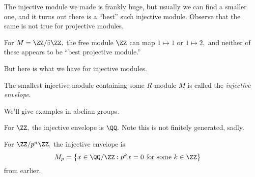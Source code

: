 The injective module we made is frankly huge, but usually we can find a smaller one, and it turns out there is a ``best'' such injective module. Observe that the same is not true for projective modules.
\begin{example}
	For $M=\ZZ/5\ZZ,$ the free module $\ZZ$ can map $1\mapsto1$ or $1\mapsto2,$ and neither of these appears to be ``best projective module.''
\end{example}
But here is what we have for injective modules.
\begin{definition}
	The smallest injective module containing some $R$-module $M$ is called the \textit{injective envelope}.
\end{definition}
We'll give examples in abelian groups.
\begin{example}
	For $\ZZ,$ the injective envelope is $\QQ.$ Note this is not finitely generated, sadly.
\end{example}
\begin{example}
	For $\ZZ/p^n\ZZ,$ the injective envelope is
	\[M_p=\left\{x\in\QQ/\ZZ:p^kx=0\text{ for some }k\in\ZZ\right\}\]
	from earlier.
\end{example}

